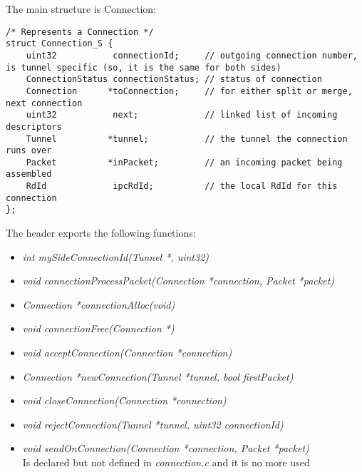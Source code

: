 The main structure is Connection:

\begin{lstlisting}
/* Represents a Connection */
struct Connection_S {
    uint32           connectionId;     // outgoing connection number, is tunnel specific (so, it is the same for both sides)
    ConnectionStatus connectionStatus; // status of connection
    Connection      *toConnection;     // for either split or merge, next connection
    uint32           next;             // linked list of incoming descriptors
    Tunnel          *tunnel;           // the tunnel the connection runs over
    Packet          *inPacket;         // an incoming packet being assembled
    RdId             ipcRdId;          // the local RdId for this connection
};
\end{lstlisting}

The header exports the following functions:

\begin{itemize}

	\item \emph{int mySideConnectionId(Tunnel *, uint32)}

	\item \emph{void connectionProcessPacket(Connection *connection, Packet *packet)}

	\item \emph{Connection *connectionAlloc(void)}

	\item \emph{void connectionFree(Connection *)
}
	\item \emph{void acceptConnection(Connection *connection)}

	\item \emph{Connection *newConnection(Tunnel *tunnel, bool firstPacket)}

	\item \emph{void closeConnection(Connection *connection)}

	\item \emph{void rejectConnection(Tunnel *tunnel, uint32 connectionId)}
	
	\item \emph{void sendOnConnection(Connection *connection, Packet *packet)}
	\\Is declared but not defined in \emph{connection.c} and it is no more used
	
\end{itemize}

